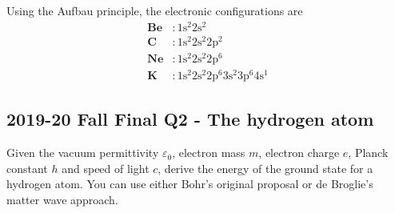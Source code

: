 \documentclass[12pt]{book} %
\numberwithin{equation}{chapter}
\def\e{\varepsilon}
\begin{document}
\begin{solbox}
Using the Aufbau principle, the electronic configurations are
\begin{align*}
\mathbf{Be}&:1\text{s}^{2}2\text{s}^{2}\\
\mathbf{C}&:1\text{s}^{2}2\text{s}^{2}2\text{p}^{2}\\
\mathbf{Ne}&:1\text{s}^{2}2\text{s}^{2}2\text{p}^{6}\\
\mathbf{K}&:1\text{s}^{2}2\text{s}^{2}2\text{p}^{6}3\text{s}^{2}3\text{p}^{6}4\text{s}^{1}
\end{align*}
\end{solbox}

\subsection*{2019-20 Fall Final Q2 - The hydrogen atom}
\label{The hydrogen atom}
Given the vacuum permittivity $\e_{0}$, electron mass $m$, electron charge $e$, Planck constant $h$ and speed of light $c$, derive the energy of the ground state for a hydrogen atom. You can use either Bohr's original proposal or de Broglie's matter wave approach.
\end{document}
